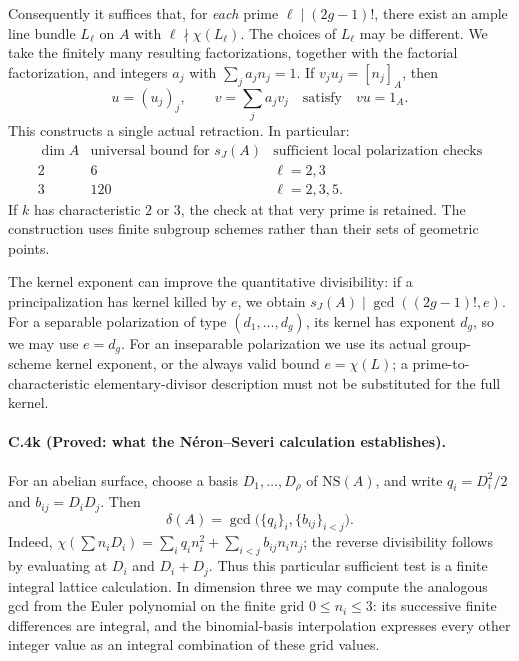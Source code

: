 Consequently it suffices that, for \emph{each} prime
$\ell\mid(2g-1)!$, there exist an ample line bundle $L_\ell$ on $A$
with $\ell\nmid\chi(L_\ell)$.
The choices of $L_\ell$ may be different. We take the finitely many
resulting factorizations, together with the factorial factorization,
and integers $a_j$ with $\sum_j a_j n_j=1$. If
$v_j u_j=[n_j]_A$, then
\[
                 u=(u_j)_j,\qquad v=\sum_j a_jv_j
                 \quad\text{satisfy}\quad vu=1_A.
\]
This constructs a single actual retraction. In particular:
\[
\begin{array}{c|c|c}
 \dim A & \text{universal bound for }s_J(A)
        &\text{sufficient local polarization checks}\\ \hline
 2 & 6 & \ell=2,3\\
 3 & 120 & \ell=2,3,5.
\end{array}
\]
If $k$ has characteristic $2$ or $3$, the check at that very prime
is retained. The construction uses finite subgroup schemes rather
than their sets of geometric points.

The kernel exponent can improve the quantitative divisibility:
if a principalization has kernel killed by $e$, we obtain
$s_J(A)\mid\gcd((2g-1)!,e)$.
For a separable polarization of type
$(d_1,\ldots,d_g)$, its kernel has exponent $d_g$, so we may use
$e=d_g$. For an inseparable polarization we use its actual
group-scheme kernel exponent, or the always valid bound
$e=\chi(L)$; a prime-to-characteristic elementary-divisor
description must not be substituted for the full kernel.

\paragraph{C.4k (Proved: what the N\'eron--Severi calculation establishes).}
For an abelian surface, choose a basis $D_1,\ldots,D_\rho$ of
$\mathrm{NS}(A)$, and write
$q_i=D_i^2/2$ and $b_{ij}=D_iD_j$. Then
\begin{equation}\label{eq:c4-delta-surface}
 \delta(A)=\gcd\bigl(\{q_i\}_i,\{b_{ij}\}_{i<j}\bigr).
\end{equation}
Indeed,
$\chi(\sum n_iD_i)=\sum_iq_in_i^2+\sum_{i<j}b_{ij}n_in_j$;
the reverse divisibility follows by evaluating at $D_i$ and
$D_i+D_j$. Thus this particular sufficient test is a finite
integral lattice calculation.
In dimension three we may compute the analogous gcd from the
Euler polynomial on the finite grid $0\le n_i\le3$: its successive
finite differences are integral, and the binomial-basis
interpolation expresses every other integer value as an integral
combination of these grid values.

